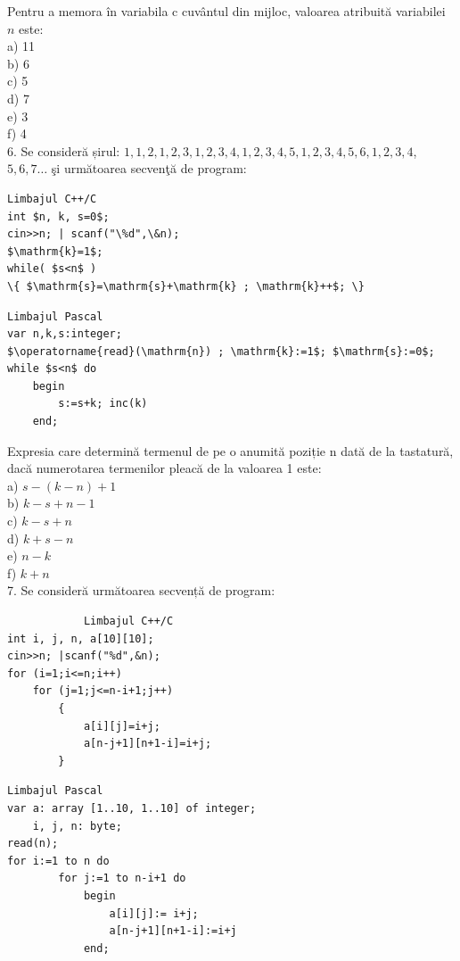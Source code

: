 \documentclass[10pt]{article}
\begin{document}
Pentru a memora în variabila c cuvântul din mijloc, valoarea atribuită variabilei $n$ este:\\
a) 11\\
b) 6\\
c) 5\\
d) 7\\
e) 3\\
f) 4\\
6. Se consideră șirul: $1,1,2,1,2,3,1,2,3,4,1,2,3,4,5,1,2,3,4,5,6,1,2,3,4$, $5,6,7 \ldots$ şi următoarea secvenţă de program:

\begin{verbatim}
Limbajul C++/C
int $n, k, s=0$;
cin>>n; | scanf("\%d",\&n);
$\mathrm{k}=1$;
while( $s<n$ )
\{ $\mathrm{s}=\mathrm{s}+\mathrm{k} ; \mathrm{k}++$; \}
\end{verbatim}

\begin{verbatim}
Limbajul Pascal
var n,k,s:integer;
$\operatorname{read}(\mathrm{n}) ; \mathrm{k}:=1$; $\mathrm{s}:=0$;
while $s<n$ do
    begin
        s:=s+k; inc(k)
    end;
\end{verbatim}

Expresia care determină termenul de pe o anumită poziție n dată de la tastatură, dacă numerotarea termenilor pleacă de la valoarea 1 este:\\
a) $s-(k-n)+1$\\
b) $k-s+n-1$\\
c) $k-s+n$\\
d) $k+s-n$\\
e) $n-k$\\
f) $k+n$\\
7. Se consideră următoarea secvență de program:

\begin{verbatim}
            Limbajul C++/C
int i, j, n, a[10][10];
cin>>n; |scanf("%d",&n);
for (i=1;i<=n;i++)
    for (j=1;j<=n-i+1;j++)
        {
            a[i][j]=i+j;
            a[n-j+1][n+1-i]=i+j;
        }
\end{verbatim}

\begin{verbatim}
Limbajul Pascal
var a: array [1..10, 1..10] of integer;
    i, j, n: byte;
read(n);
for i:=1 to n do
        for j:=1 to n-i+1 do
            begin
                a[i][j]:= i+j;
                a[n-j+1][n+1-i]:=i+j
            end;
\end{verbatim}
\end{document}
